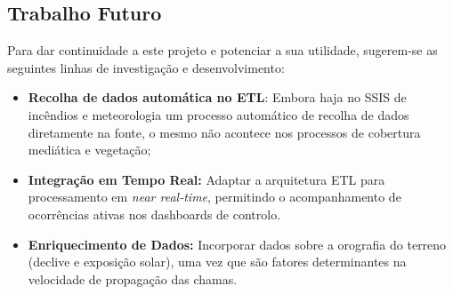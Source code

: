 \subsection{Trabalho Futuro}
Para dar continuidade a este projeto e potenciar a sua utilidade, sugerem-se as seguintes linhas de investigação e desenvolvimento:

\begin{itemize}
	\item \textbf{Recolha de dados automática no ETL}: Embora haja no SSIS de incêndios e meteorologia um processo automático de recolha de dados diretamente na fonte, o mesmo não acontece nos processos de cobertura mediática e vegetação;
	\item \textbf{Integração em Tempo Real:} Adaptar a arquitetura ETL para processamento em \textit{near real-time}, permitindo o acompanhamento de ocorrências ativas nos dashboards de controlo.
	\item \textbf{Enriquecimento de Dados:} Incorporar dados sobre a orografia do terreno (declive e exposição solar), uma vez que são fatores determinantes na velocidade de propagação das chamas.
\end{itemize}